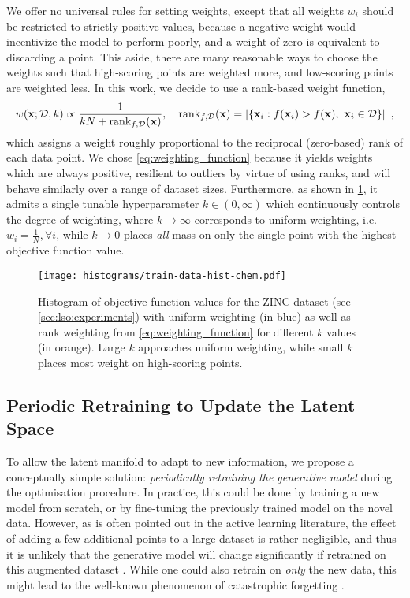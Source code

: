 We offer no universal rules for setting weights, except that all weights $w_i$ should be restricted to strictly positive values,
because a negative weight would incentivize the model to perform poorly,
and a weight of zero is equivalent to discarding a point.
This aside, there are many reasonable ways to choose the weights such that high-scoring points are weighted more,
and low-scoring points are weighted less.
In this work, we decide to use a rank-based weight function,
\begin{equation}
\label{eq:weighting_function}
    w(\mathbf{x}; \mathcal{D}, k) \propto \frac{1}{kN + \text{rank}_{f,\mathcal{D}}(\mathbf{x})}, \quad \text{rank}_{f,\mathcal{D}}(\mathbf{x}) = \left|\left\{\mathbf{x}_i : f(\mathbf{x}_i) > f(\mathbf{x}),\ \mathbf{x}_i \in \mathcal{D} \right\}\right|\ ,
\end{equation}
which assigns a weight roughly proportional to the reciprocal (zero-based) rank of each data point.
We chose \cref{eq:weighting_function} because it yields weights which are always positive,
resilient to outliers by virtue of using ranks, and will behave similarly over a range of dataset sizes.
Furthermore, as shown in \cref{fig:weighting}, it admits a single tunable hyperparameter $k\in(0,\infty)$ which continuously controls the degree of weighting,
where $k\to\infty$ corresponds to uniform weighting, i.e.\@ $w_i = \frac{1}{N}, \forall i$, while $k\to0$ places \emph{all} mass on only the single point with the highest objective function value.

\begin{figure}[ht]
    \centering
    \texttt{[image: histograms/train-data-hist-chem.pdf]}
    \caption[Histogram of objective function values for the ZINC dataset]{
    Histogram of objective function values for the ZINC dataset (see \cref{sec:lso:experiments})
    with uniform weighting (in blue) as well as rank weighting from \cref{eq:weighting_function} for different $k$ values (in orange).
    Large $k$ approaches uniform weighting, while small $k$ places most weight on high-scoring points.
    }
    \label{fig:weighting}
\end{figure}

\subsection{Periodic Retraining to Update the Latent Space}
\label{subsec:retraining}
To allow the latent manifold to adapt to new information,
we propose a conceptually simple solution: \emph{periodically retraining the generative model} during the optimisation procedure.
In practice, this could be done by training a new model from scratch,
or by fine-tuning the previously trained model on the novel data.
However, as is often pointed out in the active learning literature,
the effect of adding a few additional points to a large dataset is rather negligible,
and thus it is unlikely that the generative model will change significantly if retrained on
this augmented dataset \citep{sener_active_2018}.
While one could also retrain on \emph{only} the new data,
this might lead to the well-known phenomenon of catastrophic forgetting \citep{mccloskey_catastrophic_1989}.

